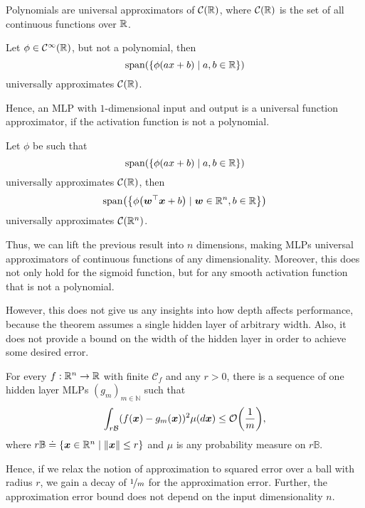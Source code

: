 \begin{theorem}
    Polynomials are universal approximators of $\mathcal{C}(\mathbb{R})$, where $\mathcal{C}(\mathbb{R})$ is the set
    of all continuous functions over $\mathbb{R}$.
\end{theorem}

\begin{theorem}
    Let $\phi \in \mathcal{C}^{\infty}(\mathbb{R})$, but not a polynomial, then \[
        \mathrm{span}(\{ \phi(ax + b) \mid a,b \in \mathbb{R} \})
    \]
    universally approximates $\mathcal{C}(\mathbb{R})$.
\end{theorem}

Hence, an MLP with $1$-dimensional input and output is a universal function approximator, if the
activation function is not a polynomial.

\begin{lemma}
    Let $\phi$ be such that \[
        \mathrm{span}(\{ \phi(ax + b) \mid a,b \in \mathbb{R} \})
    \]
    universally approximates $\mathcal{C}(\mathbb{R})$, then \[
        \mathrm{span}\lft( \lft\{ \phi \lft( \transpose{\vec{w}}\vec{x} + b \rgt) \mid \vec{w} \in \R^n, b \in \R \rgt\} \rgt)
    \]
    universally approximates $\mathcal{C}(\mathbb{R}^n)$.
\end{lemma}

Thus, we can lift the previous result into $n$ dimensions, making MLPs universal approximators of
continuous functions of any dimensionality. Moreover, this does not only hold for the sigmoid
function, but for any smooth activation function that is not a polynomial.

However, this does not give us any insights into how depth affects performance, because the theorem
assumes a single hidden layer of arbitrary width. Also, it does not provide a bound on the width of
the hidden layer in order to achieve some desired error.

\begin{theorem}
    For every $f: \mathbb{R}^n \to \mathbb{R}$ with finite $\mathcal{C}_f$ and any $r > 0$, there is a sequence of one hidden layer MLPs $(g_m)_{m \in \mathbb{N}}$ such that \[
        \int_{r \mathcal{B}} (f(\vec{x}) - g_m(\vec{x}))^2 \mu(d \vec{x}) \leq \bigo{\frac{1}{m}},
    \]
    where $r \mathbb{B} \doteq \{ \bm{x} \in \mathbb{R}^n \mid \| \bm{x} \| \leq r \}$ and $\mu$ is any
    probability measure on $r \mathbb{B}$.
\end{theorem}

Hence, if we relax the notion of approximation to squared error over a ball with radius $r$, we
gain a decay of $\nicefrac{1}{m}$ for the approximation error. Further, the approximation error
bound does not depend on the input dimensionality $n$.

